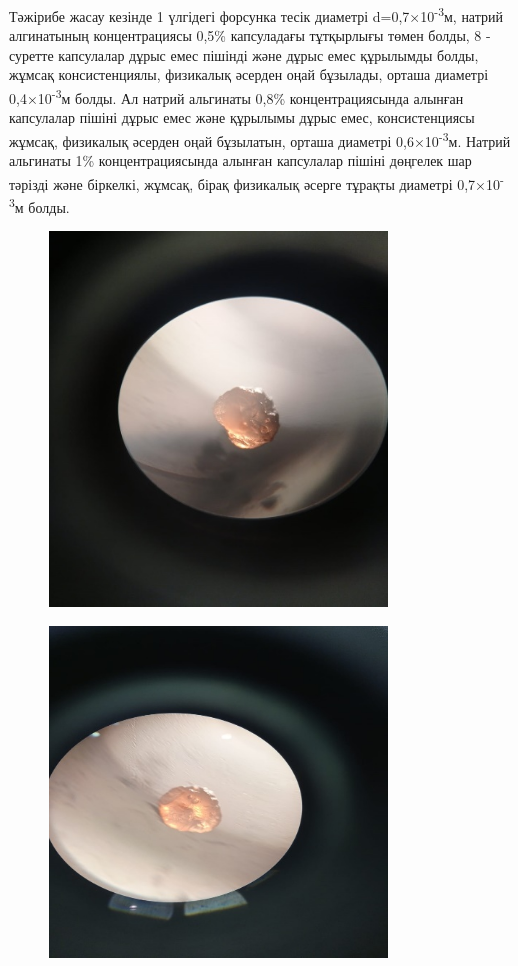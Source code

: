 Тәжірибе жасау кезінде 1 үлгідегі форсунка тесік диаметрі
d=0,7×10\textsuperscript{-3}м, натрий алгинатының концентрациясы 0,5\%
капсуладағы тұтқырлығы төмен болды, 8 - суретте капсулалар дұрыс емес
пішінді және дұрыс емес құрылымды болды, жұмсақ консистенциялы,
физикалық әсерден оңай бұзылады, орташа диаметрі
0,4×10\textsuperscript{-3}м болды. Ал натрий альгинаты 0,8\%
концентрациясында алынған капсулалар пішіні дұрыс емес және құрылымы
дұрыс емес, консистенциясы жұмсақ, физикалық әсерден оңай бұзылатын,
орташа диаметрі 0,6×10\textsuperscript{-3}м. Натрий альгинаты 1\%
концентрациясында алынған капсулалар пішіні дөңгелек шар тәрізді және
біркелкі, жұмсақ, бірақ физикалық әсерге тұрақты диаметрі
0,7×10\textsuperscript{-3}м болды.


\begin{figure}[H]
	\centering
	\includegraphics[width=0.8\textwidth]{media/pish/image35}
	\caption*{}
\end{figure}


\begin{figure}[H]
	\centering
	\includegraphics[width=0.8\textwidth]{media/pish/image36}
	\caption*{}
\end{figure}


